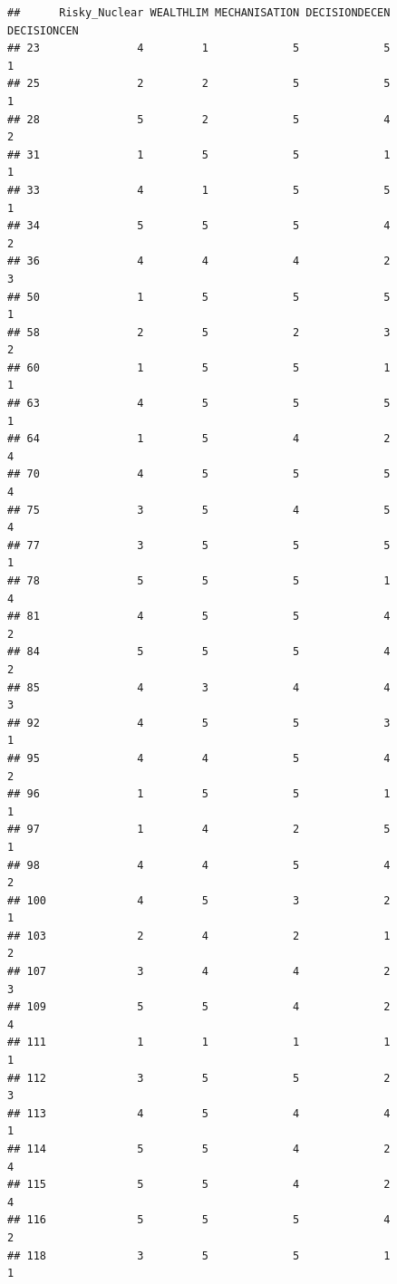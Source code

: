 \documentclass[
]{article}
\begin{document}
\begin{verbatim}
##      Risky_Nuclear WEALTHLIM MECHANISATION DECISIONDECEN DECISIONCEN
## 23               4         1             5             5           1
## 25               2         2             5             5           1
## 28               5         2             5             4           2
## 31               1         5             5             1           1
## 33               4         1             5             5           1
## 34               5         5             5             4           2
## 36               4         4             4             2           3
## 50               1         5             5             5           1
## 58               2         5             2             3           2
## 60               1         5             5             1           1
## 63               4         5             5             5           1
## 64               1         5             4             2           4
## 70               4         5             5             5           4
## 75               3         5             4             5           4
## 77               3         5             5             5           1
## 78               5         5             5             1           4
## 81               4         5             5             4           2
## 84               5         5             5             4           2
## 85               4         3             4             4           3
## 92               4         5             5             3           1
## 95               4         4             5             4           2
## 96               1         5             5             1           1
## 97               1         4             2             5           1
## 98               4         4             5             4           2
## 100              4         5             3             2           1
## 103              2         4             2             1           2
## 107              3         4             4             2           3
## 109              5         5             4             2           4
## 111              1         1             1             1           1
## 112              3         5             5             2           3
## 113              4         5             4             4           1
## 114              5         5             4             2           4
## 115              5         5             4             2           4
## 116              5         5             5             4           2
## 118              3         5             5             1           1

\end{verbatim}
\end{document}
